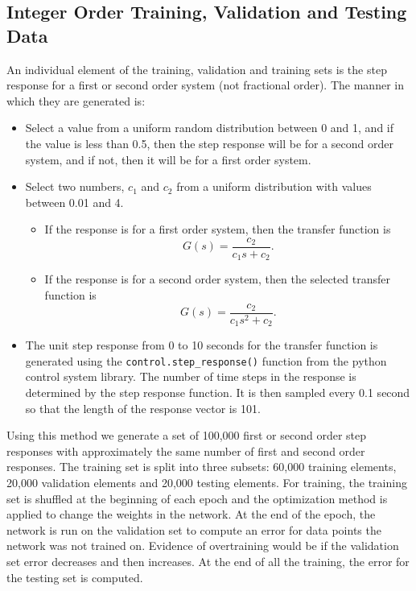 \subsection{Integer Order Training, Validation and Testing Data}

  An individual element of the training, validation and training sets is the
  step response for a first or second order system (not fractional order). The
  manner in which they are generated is:

  \begin{itemize}

    \item Select a value from a uniform random distribution between 0 and 1, and
    if the value is less than 0.5, then the step response will be for a second
    order system, and if not, then it will be for a first order system.

    \item Select two numbers, $c_1$ and $c_2$ from a uniform distribution with
    values between 0.01 and 4.

    \begin{itemize}

      \item If the response is for a first order system, then the transfer
      function is
      \[
        G(s) = \frac{c_2}{c_1 s + c_2}.
      \]

      \item If the response is for a second order system, then the selected
      transfer function is
      \[
        G(s) = \frac{c_2}{c_1 s^2 + c_2}.
      \]

    \end{itemize}

	\item The unit step response from 0 to 10 seconds for the transfer function
	  is generated using the \texttt{control.step\_response()} function from the
	  python control system library. The number of time steps in the response is
	  determined by the step response function. It is then sampled every 0.1
	  second so that the length of the response vector is 101.

\end{itemize} 

    Using this method we generate a set of 100,000 first or second order step
    responses with approximately the same number of first and second order
    responses. The training set is split into three subsets: 60,000 training
    elements, 20,000 validation elements and 20,000 testing elements. For
    training, the training set is shuffled at the beginning of each epoch and
    the optimization method is applied to change the weights in the network.  At
    the end of the epoch, the network is run on the validation set to compute an
    error for data points the network was not trained on. Evidence of
    overtraining would be if the validation set error decreases and then
    increases.  At the end of all the training, the error for the testing set is
    computed.

